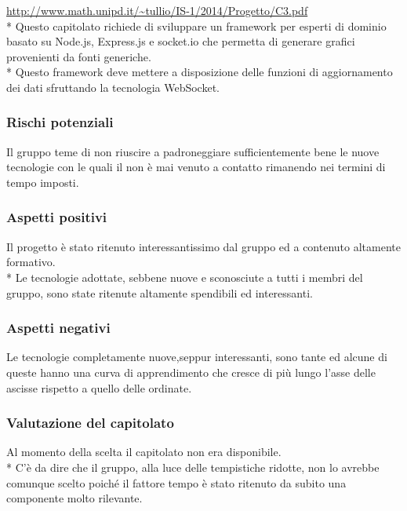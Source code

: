 \url{http://www.math.unipd.it/~tullio/IS-1/2014/Progetto/C3.pdf} \\*
Questo capitolato richiede di sviluppare un framework per esperti di dominio basato su Node.js, Express.js e socket.io che permetta di generare grafici provenienti da fonti generiche. \\*
Questo framework deve mettere a disposizione delle funzioni di aggiornamento dei dati sfruttando la tecnologia WebSocket.
\subsubsection{Rischi potenziali} 
Il gruppo teme di non riuscire a padroneggiare sufficientemente bene le nuove tecnologie con le quali il non è mai venuto a contatto rimanendo nei termini di tempo imposti.
\subsubsection{Aspetti positivi}
Il progetto è stato ritenuto interessantissimo dal gruppo ed a contenuto altamente formativo. \\*
Le tecnologie adottate, sebbene nuove e sconosciute a tutti i membri del gruppo, sono state ritenute altamente spendibili ed interessanti.
\subsubsection{Aspetti negativi}
Le tecnologie completamente nuove,seppur interessanti, sono tante ed alcune di queste hanno una curva di apprendimento che cresce di più lungo l’asse delle ascisse rispetto a quello delle ordinate.
\subsubsection{Valutazione del capitolato}
Al momento della scelta il capitolato non era disponibile.\\* C’è da dire che il gruppo, alla luce delle tempistiche ridotte, non lo avrebbe comunque scelto poiché il fattore tempo è stato ritenuto da subito una componente molto rilevante.
